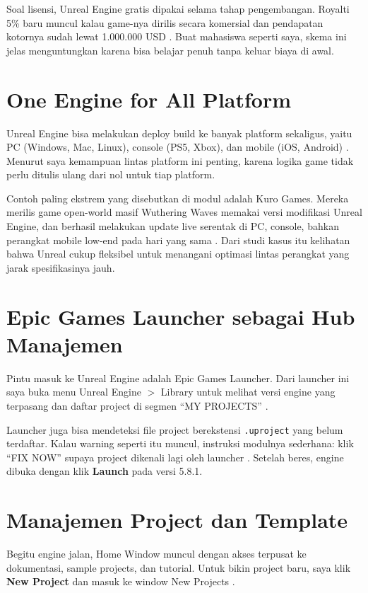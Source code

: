 \documentclass[a4paper,oneside,12pt]{report}
\begin{document}
Soal lisensi, Unreal Engine gratis dipakai selama tahap pengembangan. Royalti 5\% baru muncul kalau game-nya dirilis secara komersial dan pendapatan kotornya sudah lewat 1.000.000 USD \cite{modul2}. Buat mahasiswa seperti saya, skema ini jelas menguntungkan karena bisa belajar penuh tanpa keluar biaya di awal.

\section{One Engine for All Platform}
Unreal Engine bisa melakukan deploy build ke banyak platform sekaligus, yaitu PC (Windows, Mac, Linux), console (PS5, Xbox), dan mobile (iOS, Android) \cite{modul2,epic-variants}. Menurut saya kemampuan lintas platform ini penting, karena logika game tidak perlu ditulis ulang dari nol untuk tiap platform.

Contoh paling ekstrem yang disebutkan di modul adalah Kuro Games. Mereka merilis game open-world masif Wuthering Waves memakai versi modifikasi Unreal Engine, dan berhasil melakukan update live serentak di PC, console, bahkan perangkat mobile low-end pada hari yang sama \cite{kurogames,wuthering-cover}. Dari studi kasus itu kelihatan bahwa Unreal cukup fleksibel untuk menangani optimasi lintas perangkat yang jarak spesifikasinya jauh.

\section{Epic Games Launcher sebagai Hub Manajemen}
Pintu masuk ke Unreal Engine adalah Epic Games Launcher. Dari launcher ini saya buka menu Unreal Engine $>$ Library untuk melihat versi engine yang terpasang dan daftar project di segmen ``MY PROJECTS'' \cite{modul2}.

Launcher juga bisa mendeteksi file project berekstensi \texttt{.uproject} yang belum terdaftar. Kalau warning seperti itu muncul, instruksi modulnya sederhana: klik ``FIX NOW'' supaya project dikenali lagi oleh launcher \cite{modul2}. Setelah beres, engine dibuka dengan klik \textbf{Launch} pada versi 5.8.1.

\section{Manajemen Project dan Template}
Begitu engine jalan, Home Window muncul dengan akses terpusat ke dokumentasi, sample projects, dan tutorial. Untuk bikin project baru, saya klik \textbf{New Project} dan masuk ke window New Projects \cite{modul2,epic-variants}.
\end{document}
